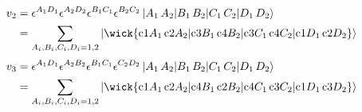 \begin{align*}
    v_2&=\epsilon^{A_1D_1}\epsilon^{A_2D_2}\epsilon^{B_1C_1}\epsilon^{B_2C_2}\ket{A_1\,A_2|B_1\,B_2|C_1\,C_2|D_1\,D_2}\\
    &=\sum_{A_i,B_i,C_i,D_i=1,2}\ket{\wick{\c1{A_1}\,\c2{A_2}|\c3{B_1}\,\c4{B_2}|\c3{C_1}\,\c4{C_2}|\c1{D_1}\,\c2{D_2}}}    
\end{align*}
\begin{align*}
    v_3&=\epsilon^{A_1D_1}\epsilon^{A_2B_2}\epsilon^{B_1C_1}\epsilon^{C_2D_2}\ket{A_1\,A_2|B_1\,B_2|C_1\,C_2|D_1\,D_2}\\
    &=\sum_{A_i,B_i,C_i,D_i=1,2}\ket{\wick{\c1{A_1}\,\c2{A_2}|\c4{B_1}\,\c2{B_2}|\c4{C_1}\,\c3{C_2}|\c1{D_1}\,\c3{D_2}}}\\
\end{align*}
